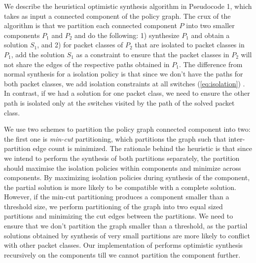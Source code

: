We describe the heuristical optimistic synthesis algorithm in Pseudocode 1,
which takes as input a connected component of the policy graph.
 The crux of the algorithm is that we partition each connected component $P$
  into two smaller components $P_1$ and $P_2$
  and do the following:
1) synthesize $P_1$ and obtain a solution $S_1$, and
2) for packet classes of $P_2$ that are
isolated to packet classes in $P_1$, 
add the solution $S_1$ as a constraint to ensure that the
packet classes in $P_2$ will not share the edges of the respective
paths obtained in $P_1$. The difference from
normal synthesis for a isolation policy is that since we don't have
the paths for both packet classes, we add isolation constraints at all
switches (\cref{eq:isolation})
. 
In contrast, if we had a solution for
one packet class, we need to ensure the other path is isolated only at
the switches visited by the path of the solved packet
class. 

We use two schemes to partition the policy graph connected component into two: the
first one is \emph{min-cut} partitioning, which partitions the graph
such that inter-partition edge count is minimized. The
rationale behind the heuristic is that since we intend to perform the
synthesis of both partitions separately, the partition should maximise
the isolation policies within components and minimize across
components. By maximizing isolation policies during synthesis of the
component, the partial solution is more likely to be compatible with a
complete solution. However, if the min-cut partitioning produces a
component smaller than a threshold size, we perform partitioning of
the graph into two equal sized partitions and minimizing the cut edges
between the partitions. We need to ensure that we don't partition the
graph smaller than a threshold, as the partial solutions obtained by
synthesis of very small partitions are more likely to conflict with
other packet classes. Our implementation of \Name performs
optimistic synthesis recursively on the components till we cannot partition the
component further. 

